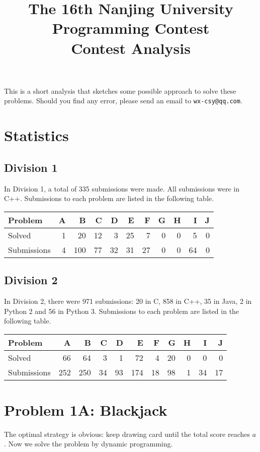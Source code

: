 \documentclass[a4paper,10.5pt,twoside]{article}
\title{\LARGE{The 16th Nanjing University Programming Contest} \\ Contest Analysis}
\begin{document}
\maketitle

This is a short analysis that sketches some possible approach to solve these problems. Should you find any error, please send an email to \texttt{wx-csy@qq.com}.

\section*{Statistics}
\subsection*{Division 1}
In Division 1, a total of 335 submissions were made. All submissions were in C++. Submissions to each problem are listed in the following table.
\begin{table}[h]
\centering
\begin{tabular}{|l|rrrrrrrrrr|}
\hline
Problem & A & B & C & D & E & F & G & H & I & J \\ \hline
Solved & 1 & 20 & 12 & 3 & 25 & 7 & 0 & 0 & 5 & 0 \\
Submissions & 4 & 100 & 77 & 32 & 31 & 27 & 0 & 0 & 64 & 0 \\ \hline
\end{tabular}
\end{table}

\subsection*{Division 2}

In Division 2, there were 971 submissions: 20 in C, 858 in C++, 35 in Java, 2 in Python 2 and 56 in Python 3. Submissions to each problem are listed in the following table.
\begin{table}[h]
\centering
\begin{tabular}{|l|rrrrrrrrrr|}
\hline
Problem & A & B & C & D & E & F & G & H & I & J \\ \hline
Solved & 66 & 64 & 3 & 1 & 72 & 4 & 20 & 0 & 0 & 0 \\
Submissions & 252 & 250 & 34 & 93 & 174 & 18 & 98 & 1 & 34 & 17 \\ \hline
\end{tabular}

\end{table}

\section*{Problem 1A: Blackjack}
The optimal strategy is obvious: keep drawing card until the total score reaches $a$. Now we solve the problem by dynamic programming.
\end{document}
